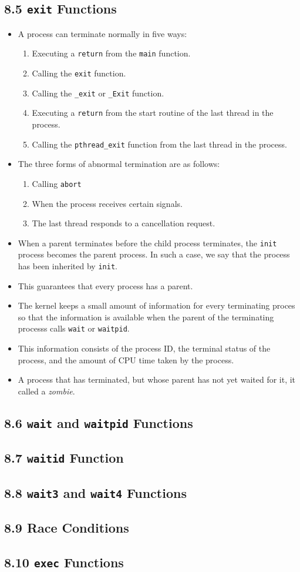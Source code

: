 \documentclass[]{article}
\newcommand{\code}{\texttt}
\begin{document}
\subsection*{8.5 \code{exit} Functions}
\begin{itemize}
\item A process can terminate normally in five ways:
\begin{enumerate}
\item Executing a \code{return} from the \code{main} function.
\item Calling the \code{exit} function.
\item Calling the \code{\_exit} or \code{\_Exit} function.
\item Executing a \code{return} from the start routine of the last thread in the
process.
\item Calling the \code{pthread\_exit} function from the last thread in the
process.
\end{enumerate}
\item The three forms of abnormal termination are as follows:
\begin{enumerate}
\item Calling \code{abort}
\item When the process receives certain signals.
\item The last thread responds to a cancellation request.
\end{enumerate}
\item When a parent terminates before the child process terminates, the
\code{init} process becomes the parent process. In such a case, we say that the
process has been inherited by \code{init}.
\item This guarantees that every process has a parent.
\item The kernel keeps a small amount of information for every terminating
proces so that the information is available when the parent of the terminating
processs calls \code{wait} or \code{waitpid}.
\item This information consists of the process ID, the terminal status of the
process, and the amount of CPU time taken by the process.
\item A process that has terminated, but whose parent has not yet waited for it,
it called a \emph{zombie}.
\end{itemize}

\subsection*{8.6 \code{wait} and \code{waitpid} Functions}

\subsection*{8.7 \code{waitid} Function}

\subsection*{8.8 \code{wait3} and \code{wait4} Functions}

\subsection*{8.9 Race Conditions}

\subsection*{8.10 \code{exec} Functions}
\end{document}
